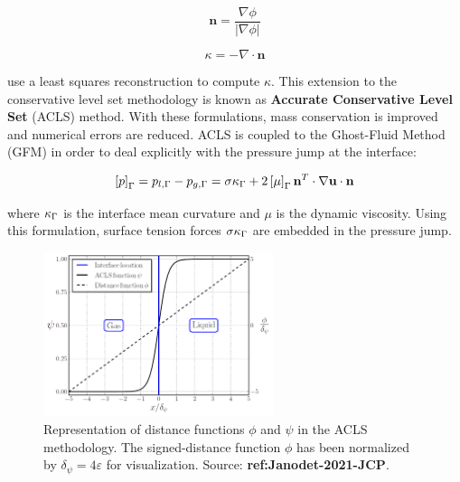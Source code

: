 \begin{equation}
\textbf{n} = \frac{\nabla \phi}{| \nabla \phi |} 
\end{equation}

\begin{equation}
\kappa = - \nabla \cdot \textbf{n}
\end{equation}

 use a least squares reconstruction to compute $\kappa$. This extension to the conservative level set methodology is known as \textbf{Accurate Conservative Level Set} (ACLS) method. With these formulations, mass conservation is improved and numerical errors are reduced. ACLS is coupled to the Ghost-Fluid Method (GFM)  in order to deal explicitly with the pressure jump at the interface:

\begin{equation}
    \left[ p \right]_{\scriptsize{\Gamma}} = p_{l,{\scriptsize{\Gamma}}} - p_{g,{\scriptsize{\Gamma}}}  = \sigma \kappa_{\scriptsize{\Gamma}} + 2 \left[ \mu \right]_{\scriptsize{\Gamma}} \textbf{n}^T \cdot \nabla \textbf{u} \cdot \textbf{n}
\end{equation}

where $\kappa_{\scriptsize{\Gamma}}$ is the interface mean curvature and $\mu$ is the dynamic viscosity. Using this formulation, surface tension forces $\sigma\kappa_{\scriptsize{\Gamma}}$ are embedded in the pressure jump. \\

\begin{figure}[ht]
    \centering
    \includegraphics[width=0.6\textwidth]{./part1_numerical_approaches/figures_ch2/ACLS_psi_phi_janodet_JCP}
       \centering
    \caption[Representation of distance functions $\phi$ and $\psi$ in the ACLS methodology]{Representation of distance functions $\phi$ and $\psi$ in the ACLS methodology. The signed-distance function $\phi$ has been normalized by $\delta_\psi = 4\varepsilon$ for visualization. Source: \textbf{ref:Janodet-2021-JCP}.}
    \label{fig:psi_phi_profiles_janodet_2021_JCP}
\end{figure}



